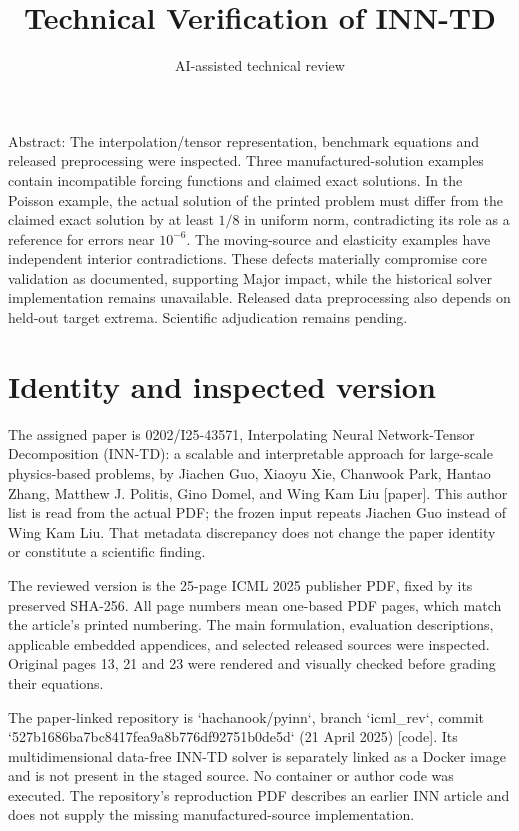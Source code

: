 \documentclass[10pt]{article}
\title{Technical Verification of INN-TD}
\author{AI-assisted technical review}
\date{}
\begin{document}
\maketitle
Abstract: The interpolation/tensor representation, benchmark equations and released preprocessing were inspected. Three manufactured-solution examples contain incompatible forcing functions and claimed exact solutions. In the Poisson example, the actual solution of the printed problem must differ from the claimed exact solution by at least \(1/8\) in uniform norm, contradicting its role as a reference for errors near \(10^{-6}\). The moving-source and elasticity examples have independent interior contradictions. These defects materially compromise core validation as documented, supporting Major impact, while the historical solver implementation remains unavailable. Released data preprocessing also depends on held-out target extrema. Scientific adjudication remains pending.\par
\section*{Identity and inspected version}
The assigned paper is 0202/I25-43571, Interpolating Neural Network-Tensor Decomposition (INN-TD): a scalable and interpretable approach for large-scale physics-based problems, by Jiachen Guo, Xiaoyu Xie, Chanwook Park, Hantao Zhang, Matthew J. Politis, Gino Domel, and Wing Kam Liu [paper]. This author list is read from the actual PDF; the frozen input repeats Jiachen Guo instead of Wing Kam Liu. That metadata discrepancy does not change the paper identity or constitute a scientific finding.\par
The reviewed version is the 25-page ICML 2025 publisher PDF, fixed by its preserved SHA-256. All page numbers mean one-based PDF pages, which match the article’s printed numbering. The main formulation, evaluation descriptions, applicable embedded appendices, and selected released sources were inspected. Original pages 13, 21 and 23 were rendered and visually checked before grading their equations.\par
The paper-linked repository is `hachanook/pyinn`, branch `icml\_rev`, commit `527b1686ba7bc8417fea9a8b776df92751b0de5d` (21 April 2025) [code]. Its multidimensional data-free INN-TD solver is separately linked as a Docker image and is not present in the staged source. No container or author code was executed. The repository’s reproduction PDF describes an earlier INN article and does not supply the missing manufactured-source implementation.\par
\end{document}
